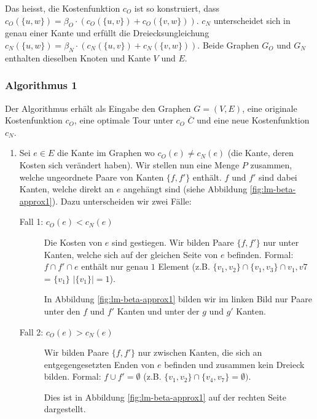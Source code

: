 \documentclass[a4paper,11pt]{scrreprt}
\begin{document}
Das heisst, die Kostenfunktion $c_O$ ist so konstruiert, dass $c_O(\{u,w\}) = \beta_O \cdot (c_O(\{u,v\}) + c_O(\{v,w\}))$. $c_N$ unterscheidet sich in genau einer Kante und erfüllt die Dreiecksungleichung $c_N(\{u,w\}) = \beta_N \cdot (c_N(\{u,v\}) + c_N(\{v,w\}))$. Beide Graphen $G_O$ und $G_N$ enthalten dieselben Knoten und Kante $V$ und $E$.

\subsubsection{Algorithmus 1}

Der Algorithmus erhält als Eingabe den Graphen $G = (V,E)$, eine originale Kostenfunktion $c_O$, eine optimale Tour unter $c_O$ $\overline{C}$ und eine neue Kostenfunktion $c_N$.

\begin{enumerate}
\item Sei $e \in E$ die Kante im Graphen wo $c_O(e) \not= c_N(e)$ (die Kante, deren Kosten sich verändert haben). Wir stellen nun eine Menge $P$ zusammen, welche ungeordnete Paare von Kanten $\{f, f'\}$ enthält. $f$ und $f'$ sind dabei Kanten, welche direkt an $e$ angehängt sind (siehe Abbildung \ref{fig:lm-beta-approx1}). Dazu unterscheiden wir zwei Fälle:

\begin{description}
\item[Fall 1: $c_O(e) < c_N(e)$] Die Kosten von $e$ sind gestiegen. Wir bilden Paare $\{f, f'\}$ nur unter Kanten, welche sich auf der gleichen Seite von $e$ befinden. Formal: $f \cap f' \cap e$ enthält nur genau $1$ Element (z.B. $\{v_1, v_2\} \cap \{v_1, v_3\} \cap {v_1, v7}$ = $\{v_1\}$ $|\{v_1\}| = 1$).

In Abbildung \ref{fig:lm-beta-approx1} bilden wir im linken Bild nur Paare unter den $f$ und $f'$ Kanten und unter der $g$ und 
$g'$ Kanten.

\item[Fall 2: $c_O(e) > c_N(e)$] Wir bilden Paare $\{f, f'\}$ nur zwischen Kanten, die sich an entgegengesetzten Enden von $e$ befinden und zusammen kein Dreieck bilden. Formal: $f \cup f' = \emptyset$ (z.B. $\{v_1, v_2\} \cap \{v_4, v_7\} = \emptyset)$.

Dies ist in Abbildung \ref{fig:lm-beta-approx1} auf der rechten Seite dargestellt.


\end{description}
\end{enumerate}
\end{document}
